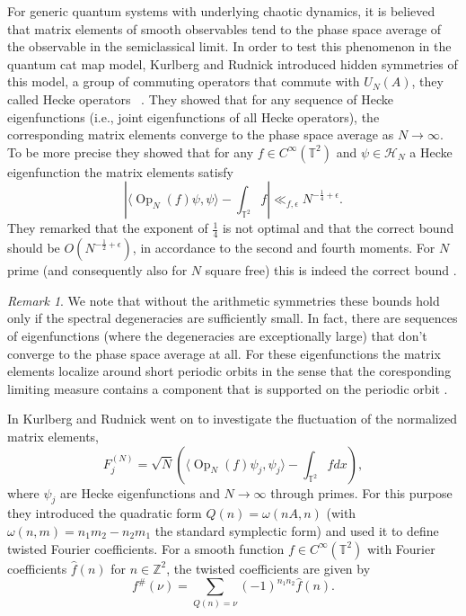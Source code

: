 \documentclass[12pt]{amsart}
\theoremstyle{definition}
\theoremstyle{remark}
\newtheorem{rem}{Remark}[section]
\numberwithin{equation}{section}
\newcommand{\bbZ}{\mathbb{Z}}
\newcommand{\bbT}{\mathbb{T}}
\newcommand{\Op}{ \operatorname{Op}}
\newcommand{\calH}{\mathcal{H}}
\begin{document}
For generic quantum systems with underlying chaotic dynamics, it is
believed that matrix elements of smooth observables tend to the
phase space average of the observable in the semiclassical limit. In
order to test this phenomenon in the quantum cat map  model,
Kurlberg and Rudnick introduced hidden symmetries of this model, a
group of commuting operators that commute with $U_N(A)$, they called
Hecke operators ~\cite{KurRud2000}. They showed that for any
sequence of Hecke eigenfunctions (i.e., joint eigenfunctions of all
Hecke operators), the corresponding matrix elements converge to the
phase space average as $N\to\infty$. To be more precise they showed
\cite[Theorem 1]{KurRud2000} that for any $f\in C^\infty(\bbT^2)$
and $\psi\in\calH_N$ a Hecke eigenfunction the matrix elements
satisfy
\[|\langle\Op_N(f)\psi,\psi\rangle-\int_{\bbT^2}f|\ll_{f,\epsilon} N^{-\frac{1}{4}+\epsilon}.\]
They remarked \cite[Remark 1.2]{KurRud2000} that the exponent of
$\frac{1}{4}$ is not optimal and that the correct bound should be
$O(N^{-\frac{1}{2}+\epsilon})$, in accordance to the second and
fourth moments. For $N$ prime (and consequently also for $N$ square
free) this is indeed the correct bound
\cite{DegliEspostiGraffiIsola95,GurevichHadani06}.

\begin{rem}
We note that without the arithmetic symmetries these bounds hold
only if the spectral degeneracies are sufficiently small. In fact,
there are sequences of eigenfunctions (where the degeneracies are
exceptionally large) that don't converge to the phase space average
at all. For these eigenfunctions the matrix elements localize around
short periodic orbits in the sense that the coresponding limiting
measure contains a component that is supported on the periodic orbit
\cite{FaureNonnenmacherDeBievre03}.
\end{rem}

In \cite{KurRud05} Kurlberg and Rudnick went on to investigate the
fluctuation of the normalized matrix elements,
\begin{equation}\label{e:F}
F_j^{(N)}=\sqrt{N}\left(\langle
\Op_N(f)\psi_j,\psi_j\rangle-\int_{\bbT^2}fdx\right),
\end{equation}
where $\psi_j$ are Hecke eigenfunctions and $N\to\infty$ through
primes. For this purpose they introduced the quadratic form
$Q(n)=\omega(nA,n)$ (with $\omega(n,m)=n_1m_2-n_2m_1$ the standard
symplectic form) and used it to define twisted Fourier coefficients.
For a smooth function $f\in C^\infty(\bbT^2)$ with Fourier
coefficients $\hat{f}(n)$ for $n\in\bbZ^2$, the twisted coefficients
are given by
\begin{equation}\label{e:Fourier}
f^{\#}(\nu)=\sum_{Q(n)=\nu}(-1)^{n_1n_2}\hat f(n).
\end{equation}
\end{document}
